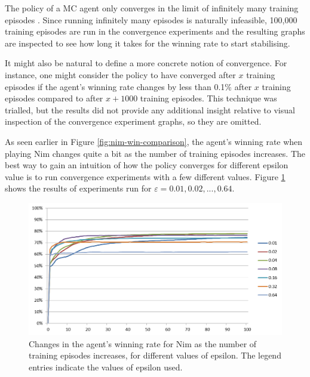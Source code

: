 \documentclass[11pt,a4paper,twoside,openright]{report}
\begin{document}
The policy of a MC agent only converges in the limit of infinitely many training episodes \cite{rl-book}. Since running infinitely many episodes is naturally infeasible, 100,000 training episodes are run in the convergence experiments and the resulting graphs are inspected to see how long it takes for the winning rate to start stabilising.

It might also be natural to define a more concrete notion of convergence. For instance, one might consider the policy to have converged after $x$ training episodes if the agent's winning rate changes by less than 0.1\% after $x$ training episodes compared to after $x+1000$ training episodes. This technique was trialled, but the results did not provide any additional insight relative to visual inspection of the convergence experiment graphs, so they are omitted.

As seen earlier in Figure \ref{fig:nim-win-comparison}, the agent's winning rate when playing Nim changes quite a bit as the number of training episodes increases. The best way to gain an intuition of how the policy converges for different epsilon value is to run convergence experiments with a few different values. Figure \ref{nim-convergence-comparison} shows the results of experiments run for $\varepsilon = 0.01, 0.02,..., 0.64$.

\begin{figure}[htbp]
	\begin{center}
		\includegraphics[width=\linewidth]{Nim_PerformanceResults_Comparison_001_to_064.png}
		\caption{Changes in the agent's winning rate for Nim as the number of training episodes increases, for different values of epsilon. The legend entries indicate the values of epsilon used.}
		\label{nim-convergence-comparison}
	\end{center}
\end{figure}
\end{document}
